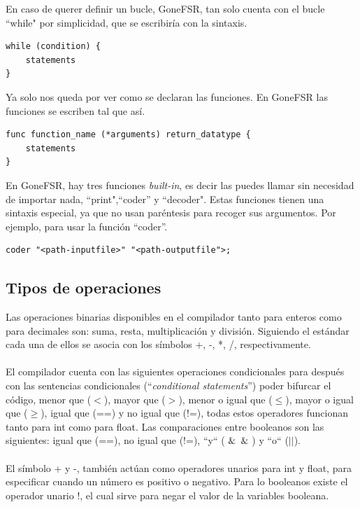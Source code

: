 \noindent En caso de querer definir un bucle,
GoneFSR, tan solo cuenta con el bucle ``while"  por simplicidad, que se escribiría con la sintaxis.

\begin{lstlisting}[style=goneStyle]
while (condition) {
    statements
}
\end{lstlisting}

\noindent Ya solo nos queda por ver como se declaran las funciones. En GoneFSR las funciones se escriben tal que así.
\begin{lstlisting}[style=goneStyle]
func function_name (*arguments) return_datatype {
    statements
}
\end{lstlisting}
En GoneFSR, hay tres funciones \textit{built-in}, es decir las puedes llamar sin necesidad de importar nada, ``print",``coder'' y ``decoder". Estas funciones tienen una sintaxis especial, ya que no usan paréntesis para recoger sus argumentos. Por ejemplo, para usar la función ``coder''.
\begin{lstlisting}[style=goneStyle]
coder "<path-inputfile>" "<path-outputfile">;
\end{lstlisting}
\subsection{Tipos de operaciones}
Las operaciones binarias disponibles en el compilador tanto para enteros como para decimales son: suma, resta, multiplicación y división. Siguiendo el estándar cada una de ellos se asocia con los símbolos +, -, *, /, respectivamente.\\\\
El compilador cuenta con las siguientes operaciones condicionales para después con las sentencias condicionales (``\textit{conditional statements}'') poder  bifurcar el código, menor que ($<$), mayor que ($>$), menor o igual que ($\leq$), mayor o igual que ($\geq$), igual que (==) y no igual que (!=), todas estos operadores funcionan tanto para int como para float. Las comparaciones entre booleanos son las siguientes: igual que (==), no igual que (!=), ``y`` ($\And\And$) y ``o`` ($||$).\\\\
El símbolo + y -, también actúan como operadores unarios para int y float, para especificar cuando un número es positivo o negativo. Para lo booleanos existe el operador unario !, el cual sirve para negar el valor de la variables booleana. 
